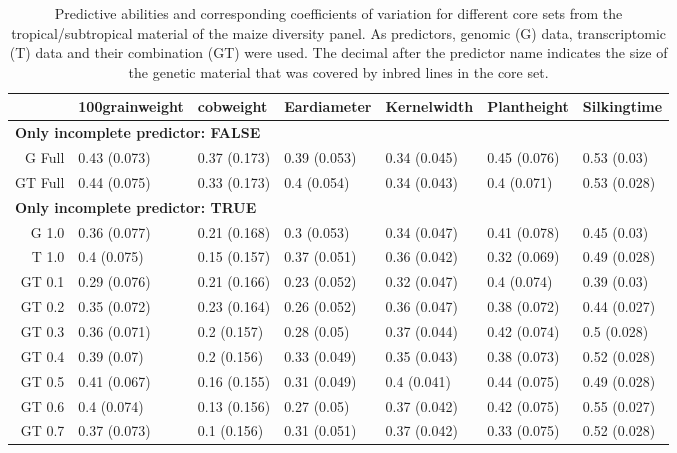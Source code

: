 \documentclass[12pt,titlepage]{article}
\begin{document}
\begin{table}[ht]
\centering
\caption{Predictive abilities and corresponding coefficients of variation for different core sets from the tropical/subtropical material of the maize diversity panel. As predictors, genomic (G) data, transcriptomic (T) data and their combination (GT) were used. The decimal after the predictor name indicates the size of the genetic material that was covered by inbred lines in the core set.} 
\label{table:InbredTable}
\begin{tabular}{rllllll}
  \toprule
 & 100grainweight & cobweight & Eardiameter & Kernelwidth & Plantheight & Silkingtime \\ 
  \midrule
\multicolumn{6}{l}{{\bfseries Only incomplete predictor: FALSE}}\\
G Full & 0.43 (0.073) & 0.37 (0.173) & 0.39 (0.053) & 0.34 (0.045) & 0.45 (0.076) & 0.53 (0.03) \\ 
  GT Full & 0.44 (0.075) & 0.33 (0.173) & 0.4 (0.054) & 0.34 (0.043) & 0.4 (0.071) & 0.53 (0.028) \\ 
   \midrule
\multicolumn{6}{l}{{\bfseries Only incomplete predictor: TRUE}}\\
G 1.0 & 0.36 (0.077) & 0.21 (0.168) & 0.3 (0.053) & 0.34 (0.047) & 0.41 (0.078) & 0.45 (0.03) \\ 
  T 1.0 & 0.4 (0.075) & 0.15 (0.157) & 0.37 (0.051) & 0.36 (0.042) & 0.32 (0.069) & 0.49 (0.028) \\ 
  GT 0.1 & 0.29 (0.076) & 0.21 (0.166) & 0.23 (0.052) & 0.32 (0.047) & 0.4 (0.074) & 0.39 (0.03) \\ 
  GT 0.2 & 0.35 (0.072) & 0.23 (0.164) & 0.26 (0.052) & 0.36 (0.047) & 0.38 (0.072) & 0.44 (0.027) \\ 
  GT 0.3 & 0.36 (0.071) & 0.2 (0.157) & 0.28 (0.05) & 0.37 (0.044) & 0.42 (0.074) & 0.5 (0.028) \\ 
  GT 0.4 & 0.39 (0.07) & 0.2 (0.156) & 0.33 (0.049) & 0.35 (0.043) & 0.38 (0.073) & 0.52 (0.028) \\ 
  GT 0.5 & 0.41 (0.067) & 0.16 (0.155) & 0.31 (0.049) & 0.4 (0.041) & 0.44 (0.075) & 0.49 (0.028) \\ 
  GT 0.6 & 0.4 (0.074) & 0.13 (0.156) & 0.27 (0.05) & 0.37 (0.042) & 0.42 (0.075) & 0.55 (0.027) \\ 
  GT 0.7 & 0.37 (0.073) & 0.1 (0.156) & 0.31 (0.051) & 0.37 (0.042) & 0.33 (0.075) & 0.52 (0.028) \\ 

\end{tabular}
\end{table}
\end{document}
